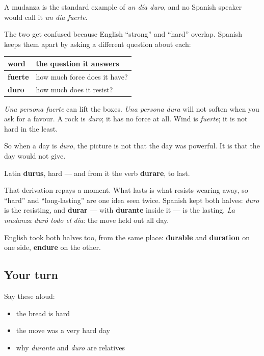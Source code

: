 A mudanza is the standard example of \emph{un día duro}, and no Spanish speaker would call it \emph{un día fuerte}.

\begin{grammarlens}[title={Grammar Lens: duro is not fuerte}]
The two get confused because English \textquotedblleft{}strong\textquotedblright{} and \textquotedblleft{}hard\textquotedblright{} overlap. Spanish keeps them apart by asking a different question about each:

\noindent
\begin{tabularx}{\linewidth}{@{}>{\raggedright\arraybackslash}X>{\raggedright\arraybackslash}X@{}}
\toprule
\textbf{word} & \textbf{the question it answers} \\
\midrule
\textbf{fuerte} & how much force does it have? \\
\textbf{duro} & how much does it resist? \\
\bottomrule
\end{tabularx}

\emph{Una persona fuerte} can lift the boxes. \emph{Una persona dura} will not soften when you ask for a favour. A rock is \emph{duro}; it has no force at all. Wind is \emph{fuerte}; it is not hard in the least.

So when a day is \emph{duro}, the picture is not that the day was powerful. It is that the day would not give.
\end{grammarlens}

\begin{cousinweb}
Latin \textbf{durus}, hard — and from it the verb \textbf{durare}, to last.

That derivation repays a moment. What lasts is what resists wearing away, so \textquotedblleft{}hard\textquotedblright{} and \textquotedblleft{}long-lasting\textquotedblright{} are one idea seen twice. Spanish kept both halves: \emph{duro} is the resisting, and \textbf{durar} — with \textbf{durante} inside it — is the lasting. \emph{La mudanza duró todo el día}: the move held out all day.

English took both halves too, from the same place: \textbf{durable} and \textbf{duration} on one side, \textbf{endure} on the other.
\end{cousinweb}

\subsection*{Your turn}
Say these aloud:

\begin{itemize}
\raggedright
  \item the bread is hard
  \item the move was a very hard day
  \item why \emph{durante} and \emph{duro} are relatives
\end{itemize}

